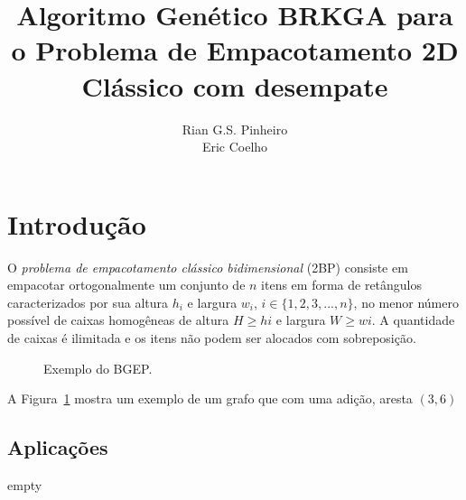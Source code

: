 \documentclass[article]{rian_article}
\author{Rian G.S. Pinheiro\\ \email{rian@ic.ufal.br}\And 
        Eric Coelho\\ \email{esc2@ic.ufal.br}}%
\title{Algoritmo Genético BRKGA para o Problema de Empacotamento 2D 	Clássico com desempate}
\begin{document}
\section{Introdução}

O \textit{problema de empacotamento clássico bidimensional} (2BP) consiste em empacotar ortogonalmente um conjunto de $n$ itens em forma de retângulos caracterizados por sua altura $h_{i}$ e largura $w_{i}$, $i \in \{1, 2, 3, ... , n\}$, no menor número possível de caixas homogêneas de altura $H \geq hi$ e largura $W \geq wi$. A quantidade de caixas é ilimitada e os itens não podem ser alocados com sobreposição.

\begin{figure}[hbt]
\centering
{}\hspace{0.1\textwidth}
\caption{Exemplo do BGEP.} \label{fig:ex}
\end{figure}
 
A Figura~\ref{fig:ex} mostra um exemplo de um grafo que com uma adição, aresta $(3,6)$

\subsection{Aplicações}
empty
\end{document}
